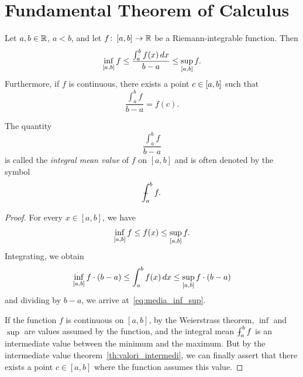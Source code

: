 \section{Fundamental Theorem of Calculus}

\begin{theorem}%
  \label{th:media_integrale}%
  \mymark{***}%
  Let $a,b\in {\mathbb R}$, $a<b$, and let
  $f\colon \left[a,b\right] \to {\mathbb R}$ be a Riemann-integrable function.
  Then
  \begin{equation}\label{eq:media_inf_sup}
    \inf_{\left[a,b\right]} f 
    \le \frac{\int_a^b f(x)\, dx}{b-a} 
    \le \sup_{\left[a,b\right]} f.
  \end{equation}
  Furthermore, if $f$ is continuous, 
  there exists a point $c \in \left[a,b\right]$
  such that
  \[
  \frac{\int_a^b f}{b-a} = f(c).
  \]
  \end{theorem}
  The quantity
  \[
    \frac{\int_a^b f}{b-a}
  \]
  is called the \emph{integral mean value} of $f$ on $[a,b]$ and is often
  denoted by the symbol
  \[
    \dashint_a^b f.
  \]
  \begin{proof}
  \mymark{***}
  For every $x\in [a,b]$, we have 
  \[
    \inf_{\left[a,b\right]} f \le f(x) \le \sup_{\left[a,b\right]}f.
  \]
  Integrating, we obtain
  \[
    \inf_{\left[a,b\right]} f \cdot (b-a)
    \le \int_a^b f(x)\, dx 
    \le \sup_{\left[a,b\right]}f\cdot (b-a)
  \]
  and dividing by $b-a$, we arrive at~\eqref{eq:media_inf_sup}.

  If the function $f$ is continuous on $[a,b]$, by the Weierstrass theorem, 
  $\inf$ and $\sup$ are values assumed by the function, 
  and the integral mean $\dashint_a^b f$ is an intermediate value between the 
  minimum and the maximum.
  But by the intermediate value theorem~\ref{th:valori_intermedi}, 
  we can finally assert that there exists a point $c\in [a,b]$
  where the function assumes this value.
\end{proof}
  
